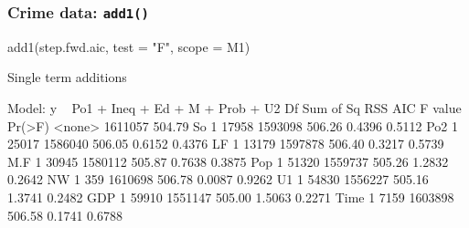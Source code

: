 \documentclass[a4paper]{article}\usepackage[]{graphicx}\usepackage[]{xcolor}
\begin{document}
\subsubsection{Crime data: \lstinline|add1()|}
\begin{Schunk}
\begin{Sinput}
add1(step.fwd.aic, test = "F", scope = M1)
\end{Sinput}
\begin{Soutput}
Single term additions

Model:
y ~ Po1 + Ineq + Ed + M + Prob + U2
       Df Sum of Sq     RSS    AIC F value Pr(>F)
<none>              1611057 504.79               
So      1     17958 1593098 506.26  0.4396 0.5112
Po2     1     25017 1586040 506.05  0.6152 0.4376
LF      1     13179 1597878 506.40  0.3217 0.5739
M.F     1     30945 1580112 505.87  0.7638 0.3875
Pop     1     51320 1559737 505.26  1.2832 0.2642
NW      1       359 1610698 506.78  0.0087 0.9262
U1      1     54830 1556227 505.16  1.3741 0.2482
GDP     1     59910 1551147 505.00  1.5063 0.2271
Time    1      7159 1603898 506.58  0.1741 0.6788
\end{Soutput}
\end{Schunk}
\end{document}
